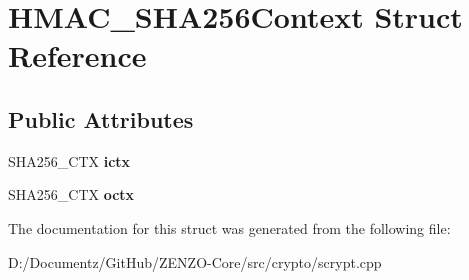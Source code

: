 \hypertarget{struct_h_m_a_c___s_h_a256_context}{}\section{H\+M\+A\+C\+\_\+\+S\+H\+A256\+Context Struct Reference}
\label{struct_h_m_a_c___s_h_a256_context}
\subsection*{Public Attributes}
\begin{DoxyCompactItemize}
\item 
\mbox{\label{struct_h_m_a_c___s_h_a256_context_a3433296fae8500c793388994de730f3c}} 
S\+H\+A256\+\_\+\+C\+TX {\bfseries ictx}
\item 
\mbox{\label{struct_h_m_a_c___s_h_a256_context_a699abe00837406f312a95226741137f4}} 
S\+H\+A256\+\_\+\+C\+TX {\bfseries octx}
\end{DoxyCompactItemize}


The documentation for this struct was generated from the following file\+:\begin{DoxyCompactItemize}
\item 
D\+:/\+Documentz/\+Git\+Hub/\+Z\+E\+N\+Z\+O-\/\+Core/src/crypto/scrypt.\+cpp\end{DoxyCompactItemize}
